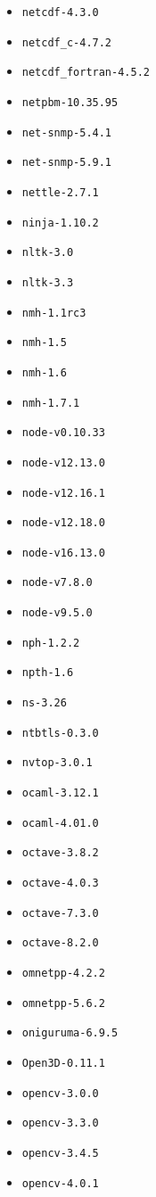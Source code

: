 \begin{multicols}{3}
\begin{itemize}
\item \verb|netcdf-4.3.0|
\item \verb|netcdf_c-4.7.2|
\item \verb|netcdf_fortran-4.5.2|
\item \verb|netpbm-10.35.95|
\item \verb|net-snmp-5.4.1|
\item \verb|net-snmp-5.9.1|
\item \verb|nettle-2.7.1|
\item \verb|ninja-1.10.2|
\item \verb|nltk-3.0|
\item \verb|nltk-3.3|
\item \verb|nmh-1.1rc3|
\item \verb|nmh-1.5|
\item \verb|nmh-1.6|
\item \verb|nmh-1.7.1|
\item \verb|node-v0.10.33|
\item \verb|node-v12.13.0|
\item \verb|node-v12.16.1|
\item \verb|node-v12.18.0|
\item \verb|node-v16.13.0|
\item \verb|node-v7.8.0|
\item \verb|node-v9.5.0|
\item \verb|nph-1.2.2|
\item \verb|npth-1.6|
\item \verb|ns-3.26|
\item \verb|ntbtls-0.3.0|
\item \verb|nvtop-3.0.1|
\item \verb|ocaml-3.12.1|
\item \verb|ocaml-4.01.0|
\item \verb|octave-3.8.2|
\item \verb|octave-4.0.3|
\item \verb|octave-7.3.0|
\item \verb|octave-8.2.0|
\item \verb|omnetpp-4.2.2|
\item \verb|omnetpp-5.6.2|
\item \verb|oniguruma-6.9.5|
\item \verb|Open3D-0.11.1|
\item \verb|opencv-3.0.0|
\item \verb|opencv-3.3.0|
\item \verb|opencv-3.4.5|
\item \verb|opencv-4.0.1|

\end{itemize}
\end{multicols}
